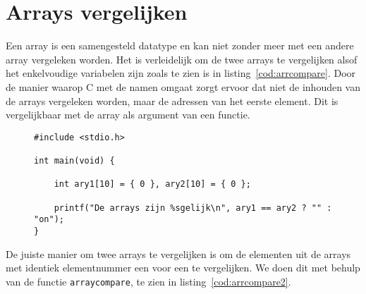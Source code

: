%
%


\section{Arrays vergelijken}
Een array is een samengesteld datatype en kan niet zonder meer met een andere array vergeleken worden. Het is verleidelijk om de twee arrays te vergelijken alsof het enkelvoudige variabelen zijn zoals te zien is in listing~\ref{cod:arrcompare}. Door de manier waarop C met de namen omgaat zorgt ervoor dat niet de inhouden van de arrays vergeleken worden, maar de adressen van het eerste element. Dit is vergelijkbaar met de array als argument van een functie.

\begin{figure}[!ht]
\begin{lstlisting}[caption=Vergelijken van twee arrays (foutief).,label=cod:arrcompare]
#include <stdio.h>

int main(void) {

	int ary1[10] = { 0 }, ary2[10] = { 0 };

	printf("De arrays zijn %sgelijk\n", ary1 == ary2 ? "" : "on");
}
\end{lstlisting}
\end{figure}

De juiste manier om twee arrays te vergelijken is om de elementen uit de arrays met identiek elementnummer een voor een te vergelijken. We doen dit met behulp van de functie \texttt{arraycompare}, te zien in listing~\ref{cod:arrcompare2}.

